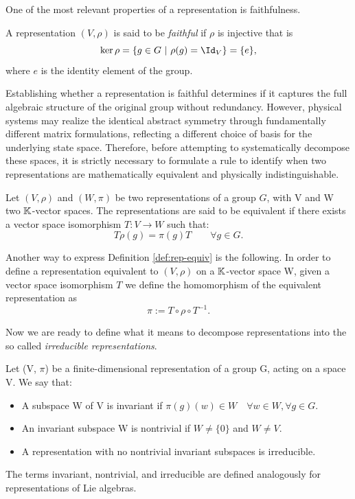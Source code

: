 \noindent One of the most relevant properties of a representation is faithfulness.
\begin{definition}\label{def:rep-faith}
	A representation $(V, \rho)$ is said to be \textit{faithful} if $\rho$ is injective that is
	\[
		\ker{\rho} = \{g \in G \ | \ \rho(g) = \Id_V\} = \{e\},
	\]
	where $e$ is the identity element of the group.
\end{definition}

Establishing whether a representation is faithful determines if it captures the full algebraic structure of the original group without redundancy. However, physical systems may realize the identical abstract symmetry through fundamentally different matrix formulations, reflecting a different choice of basis for the underlying state space. Therefore, before attempting to systematically decompose these spaces, it is strictly necessary to formulate a rule to identify when two representations are mathematically equivalent and physically indistinguishable.

\begin{definition} \label{def:rep-equiv}
	Let $(V, \rho)$ and $(W, \pi)$ be two representations of a group $G$, with V and W two $\mathbb{K}$-vector spaces. The representations are said to be equivalent if there exists a vector space isomorphism $T: V \to W$ such that:
	\[
		T\rho(g) = \pi(g)T \qquad \forall g \in G.
	\]
\end{definition}

\begin{remark}
	Another way to express Definition \autoref{def:rep-equiv} is the following. In order to define a representation equivalent to $(V, \rho)$ on a $\mathbb{K}$-vector space W, given a vector space isomorphism $T$ we define the homomorphism of the equivalent representation as
	\[
	\pi := T \circ \rho \circ T^{-1}.
	\]
\end{remark}

\noindent Now we are ready to define what it means to decompose representations into the so called \textit{irreducible representations}.

\begin{definition} \label{def:rep-irreps}
	Let (V, $\pi$) be a finite-dimensional representation of a group G, acting on a space V. 
	We say that:
	\begin{itemize}
	 \item A subspace W of V is invariant if $\pi(g)(w) \in W \quad \forall w \in W , \forall g \in G$. 
	 \item An invariant subspace W is nontrivial if $W \neq \{0\}$ and $W \neq V$. 
	 \item A representation with no nontrivial invariant subspaces is irreducible.
	\end{itemize}
	The terms invariant, nontrivial, and irreducible are defined analogously for representations of Lie algebras.
\end{definition}

